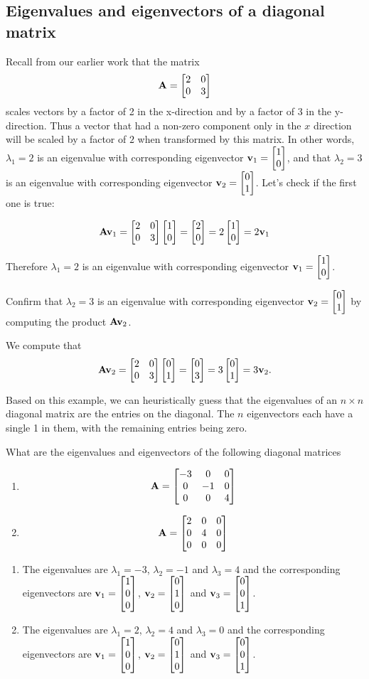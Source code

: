 \subsection{Eigenvalues and eigenvectors of a diagonal matrix}

Recall from our earlier work that the matrix
\[ \mathbf{A} = \begin{bmatrix} 2 & 0 \\ 0 & 3\end{bmatrix} \]
scales vectors by a factor of 2 in the x-direction and by a factor of 3 in the y-direction. Thus a vector that had a non-zero component only in the $x$ direction will be scaled by a factor of $2$ when transformed by this matrix.  In other words, $\lambda_1 = 2$ is an eigenvalue with corresponding eigenvector $\mathbf{v}_1 = \begin{bmatrix} 1 \\ 0 \end{bmatrix}$, and that $\lambda_2 = 3$ is an eigenvalue with corresponding eigenvector $\mathbf{v}_2 = \begin{bmatrix} 0 \\ 1 \end{bmatrix}$. Let's check if the first one is true:

\[ \mathbf{A} \mathbf{v}_1 = \begin{bmatrix} 2 & 0 \\ 0 & 3\end{bmatrix} \begin{bmatrix} 1 \\ 0 \end{bmatrix} = \begin{bmatrix} 2 \\ 0 \end{bmatrix} = 2 \begin{bmatrix} 1 \\ 0 \end{bmatrix} = 2 \mathbf{v}_1 \]

Therefore $\lambda_1 = 2$ is an eigenvalue with corresponding eigenvector $\mathbf{v}_1 = \begin{bmatrix} 1 \\ 0 \end{bmatrix}$.

\begin{prob}
Confirm that  $\lambda_2 = 3$ is an eigenvalue with corresponding eigenvector $\mathbf{v}_2 = \begin{bmatrix} 0 \\ 1 \end{bmatrix}$ by computing the product $\mathbf{A} \mathbf{v}_2$.
\end{prob}
\begin{sol}
We compute that
$$\mathbf{Av}_2 = \begin{bmatrix} 2 & 0 \\ 0 & 3\end{bmatrix} \begin{bmatrix} 0 \\ 1 \end{bmatrix} = \begin{bmatrix} 0 \\ 3 \end{bmatrix} = 3 \begin{bmatrix} 0 \\ 1 \end{bmatrix} = 3\mathbf{v}_2.$$
\end{sol}

Based on this example, we can heuristically guess that the eigenvalues of an $n\times n$ diagonal matrix are the entries on the diagonal.  The $n$ eigenvectors each have a single 1 in them, with the remaining entries being zero.
\begin{prob}
What are the eigenvalues and eigenvectors of the following diagonal matrices
\begin{enumerate}
\item \[ \mathbf{A} = \begin{bmatrix} -3 & 0 & 0 \\ 0 & -1 & 0 \\ 0 & 0 & 4 \end{bmatrix} \]
\item \[ \mathbf{A} = \begin{bmatrix} 2 & 0 & 0 \\ 0 & 4 & 0 \\ 0 & 0 & 0 \end{bmatrix} \]
\end{enumerate}
\end{prob}
\begin{sol}
\begin{enumerate}
    \item The eigenvalues are $\lambda_1 = -3$, $\lambda_2 = -1$ and $\lambda_3 =4$ and the corresponding eigenvectors are $\mathbf{v}_1 = \begin{bmatrix} 1 \\ 0 \\ 0 \end{bmatrix}$, $\mathbf{v}_2 = \begin{bmatrix} 0 \\ 1 \\ 0 \end{bmatrix}$ and $\mathbf{v}_3 = \begin{bmatrix} 0 \\ 0 \\ 1 \end{bmatrix}$.
    \item The eigenvalues are $\lambda_1 = 2$, $\lambda_2 = 4$ and $\lambda_3 =0$ and the corresponding eigenvectors are $\mathbf{v}_1 = \begin{bmatrix} 1 \\ 0 \\ 0 \end{bmatrix}$, $\mathbf{v}_2 = \begin{bmatrix} 0 \\ 1 \\ 0 \end{bmatrix}$ and $\mathbf{v}_3 = \begin{bmatrix} 0 \\ 0 \\ 1 \end{bmatrix}$.
\end{enumerate}
\end{sol}

